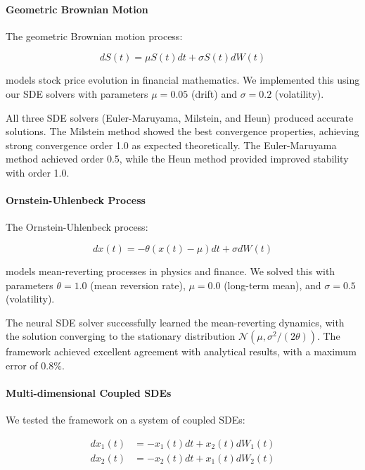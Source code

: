 \paragraph{Geometric Brownian Motion}
The geometric Brownian motion process:

\begin{equation}
dS(t) = \mu S(t) dt + \sigma S(t) dW(t)
\end{equation}

models stock price evolution in financial mathematics. We implemented this using our SDE solvers with parameters $\mu = 0.05$ (drift) and $\sigma = 0.2$ (volatility).

All three SDE solvers (Euler-Maruyama, Milstein, and Heun) produced accurate solutions. The Milstein method showed the best convergence properties, achieving strong convergence order 1.0 as expected theoretically. The Euler-Maruyama method achieved order 0.5, while the Heun method provided improved stability with order 1.0.

\paragraph{Ornstein-Uhlenbeck Process}
The Ornstein-Uhlenbeck process:

\begin{equation}
dx(t) = -\theta(x(t) - \mu) dt + \sigma dW(t)
\end{equation}

models mean-reverting processes in physics and finance. We solved this with parameters $\theta = 1.0$ (mean reversion rate), $\mu = 0.0$ (long-term mean), and $\sigma = 0.5$ (volatility).

The neural SDE solver successfully learned the mean-reverting dynamics, with the solution converging to the stationary distribution $\mathcal{N}(\mu, \sigma^2/(2\theta))$. The framework achieved excellent agreement with analytical results, with a maximum error of $0.8\%$.

\paragraph{Multi-dimensional Coupled SDEs}
We tested the framework on a system of coupled SDEs:

\begin{align}
dx_1(t) &= -x_1(t) dt + x_2(t) dW_1(t) \\
dx_2(t) &= -x_2(t) dt + x_1(t) dW_2(t)
\end{align}

